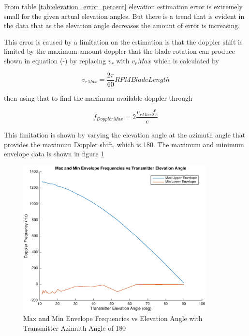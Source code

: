 From table \ref{tab:elevation_error_percent} elevation estimation error is extremely small for the given actual elevation angles. But there is a trend that is evident in the data that as the elevation angle decreases the amount of error is increasing.


This error is caused by a limitation on the estimation is that the doppler shift is limited by the maximum amount doppler that the blade rotation can produce shown in equation (-) by replacing $v_r$ with $v_rMax$ which is calculated by

\begin{equation}
	v_{rMax} = \frac{2\pi}{60} RPM BladeLength
	\label{eqn:v_radial_max}
\end{equation}

then using that to find the maximum available doppler through

\begin{equation}
	f_{DopplerMax} = 2\frac{v_{rMax} f_c}{c}
	\label{eqn:fd_max}
\end{equation}

This limitation is shown by varying the elevation angle at the azimuth angle that provides the maximum Doppler shift, which is 180\textdegree \space. The maximum and minimum envelope data is shown in figure \ref{fig:envelope_180deg}

\begin{figure}
	\begin{center}
		\includegraphics[width=10cm]{images/results/Elevation_angle_envelopes_180deg_Azimuth.eps}
		\caption{Max and Min Envelope Frequencies vs Elevation Angle with Transmitter Azimuth Angle of 180\textdegree}
		\label{fig:envelope_180deg}
	\end{center}
\end{figure}

